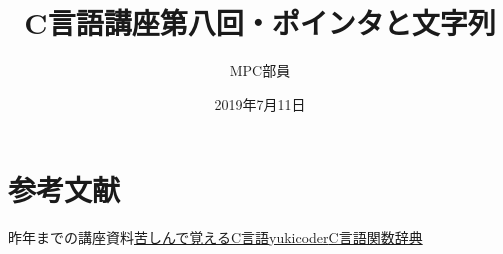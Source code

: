 \documentclass[a4j,titlepage,dvipdfmx]{jsarticle}   %
\title{C言語講座第八回・ポインタと文字列}
\author{MPC部員}
\date{2019年7月11日}
\newcommand{\articlepath}{./article}
\begin{document}
\maketitle
\section*{参考文献}
\noindent
[1]昨年までの講座資料\newline
[2]\href{http://9cguide.appspot.com}{苦しんで覚えるC言語}\newline
[3]\href{https://yukicoder.me/}{yukicoder}\newline
[4]\href{http://www.c-tipsref.com/reference/string.html}{C言語関数辞典}
\end{document}
